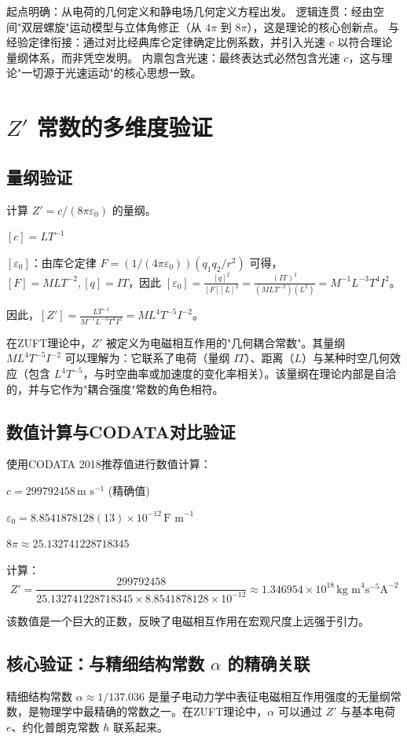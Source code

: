 \documentclass[a4paper,12pt]{article}
\theoremstyle{plain}
\begin{document}
起点明确：从电荷的几何定义和静电场几何定义方程出发。
逻辑连贯：经由空间"双层螺旋"运动模型与立体角修正（从 $4\pi$ 到 $8\pi$），这是理论的核心创新点。
与经验定律衔接：通过对比经典库仑定律确定比例系数，并引入光速 $c$ 以符合理论量纲体系，而非凭空发明。
内禀包含光速：最终表达式必然包含光速 $c$，这与理论"一切源于光速运动"的核心思想一致。

\section{$Z'$ 常数的多维度验证}

\subsection{量纲验证}
计算 $Z' = c/(8\pi\varepsilon_0)$ 的量纲。

$[c] = L T^{-1}$

$[\varepsilon_0]$：由库仑定律 $F = (1/(4\pi\varepsilon_0)) (q_1 q_2/r^2)$ 可得，$[F] = M L T^{-2}, [q] = I T$，因此 $[\varepsilon_0] = \frac{[q]^2}{[F][L]^2} = \frac{(I T)^2}{(M L T^{-2})(L^2)} = M^{-1} L^{-3} T^4 I^2$。

因此，$[Z'] = \frac{L T^{-1}}{M^{-1} L^{-3} T^4 I^2} = M L^4 T^{-5} I^{-2}$。

在ZUFT理论中，$Z'$ 被定义为电磁相互作用的"几何耦合常数"。其量纲 $M L^4 T^{-5} I^{-2}$ 可以理解为：它联系了电荷（量纲 $I T$）、距离（$L$）与某种时空几何效应（包含 $L^4 T^{-5}$，与时空曲率或加速度的变化率相关）。该量纲在理论内部是自洽的，并与它作为"耦合强度"常数的角色相符。

\subsection{数值计算与CODATA对比验证}
使用CODATA 2018推荐值进行数值计算：

$c = 299792458 \, \text{m s}^{-1}$ (精确值)

$\varepsilon_0 = 8.8541878128(13) \times 10^{-12} \, \text{F m}^{-1}$

$8\pi \approx 25.132741228718345$

计算：
$$Z' = \frac{299792458}{25.132741228718345 \times 8.8541878128 \times 10^{-12}} \approx 1.346954 \times 10^{18} \, \text{kg m}^4 \text{s}^{-5} \text{A}^{-2}$$ 

该数值是一个巨大的正数，反映了电磁相互作用在宏观尺度上远强于引力。

\subsection{核心验证：与精细结构常数 $\alpha$ 的精确关联}
精细结构常数 $\alpha \approx 1/137.036$ 是量子电动力学中表征电磁相互作用强度的无量纲常数，是物理学中最精确的常数之一。在ZUFT理论中，$\alpha$ 可以通过 $Z'$ 与基本电荷 $e$、约化普朗克常数 $\hbar$ 联系起来。
\end{document}
